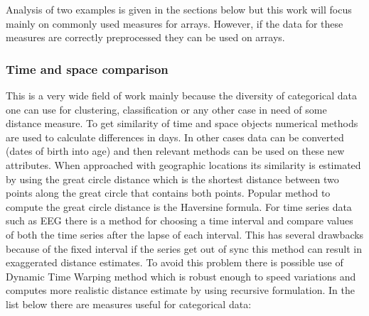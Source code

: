 Analysis of two examples is given in the sections below but this work will focus mainly on commonly used measures for arrays. However, if the data for these measures are correctly preprocessed they can be used on arrays.

\subsubsection{Time and space comparison}
This is a very wide field of work mainly because the diversity of categorical data one can use for clustering, classification or any other case in need of some distance measure.
To get similarity of time and space objects numerical methods are used to calculate differences in days. In other cases data can be converted (dates of birth into age) and then relevant methods can be used on these new attributes.
When approached with geographic locations its similarity is estimated by using the great circle distance which is the shortest distance between two points along the great circle that contains both points. Popular method to compute the great circle distance is the Haversine formula.
For time series data such as EEG there is a method for choosing a time interval and compare values of both the time series after the lapse of each interval. This has several drawbacks because of the fixed interval if the series get out of sync this method can result in exaggerated distance estimates. To avoid this problem there is possible use of Dynamic Time Warping method which is robust enough to speed variations and computes more realistic distance estimate by using recursive formulation.
In the list below there are measures useful for categorical data:
